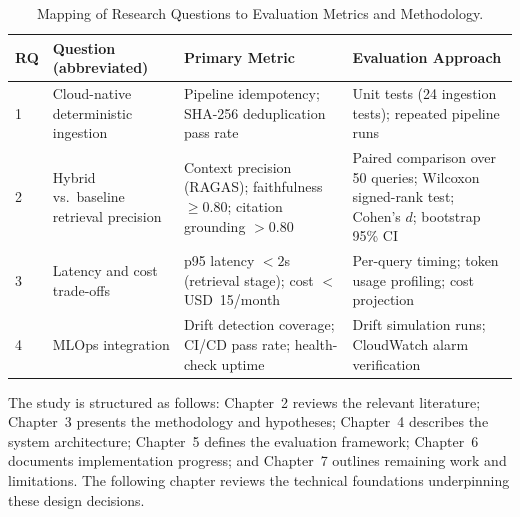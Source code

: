 \begin{table}[H]
\caption{Mapping of Research Questions to Evaluation Metrics and Methodology.}
\label{tab:rq_map}
\centering
\begin{tabular}{p{0.5cm}p{4.0cm}p{3.5cm}p{4.0cm}}
\toprule
\textbf{RQ} & \textbf{Question (abbreviated)} & \textbf{Primary Metric} & \textbf{Evaluation Approach} \\
\midrule
1 & Cloud-native deterministic ingestion & Pipeline idempotency; SHA-256 deduplication pass rate & Unit tests (24 ingestion tests); repeated pipeline runs \\[4pt]
2 & Hybrid vs.\ baseline retrieval precision & Context precision (RAGAS); faithfulness $\geq 0.80$; citation grounding $> 0.80$ & Paired comparison over 50 queries; Wilcoxon signed-rank test; Cohen's $d$; bootstrap 95\% CI \\[4pt]
3 & Latency and cost trade-offs & p95 latency $< 2$s (retrieval stage); cost $<$ USD~15/month & Per-query timing; token usage profiling; cost projection \\[4pt]
4 & MLOps integration & Drift detection coverage; CI/CD pass rate; health-check uptime & Drift simulation runs; CloudWatch alarm verification \\
\bottomrule
\end{tabular}
\end{table}

\medskip
\noindent The study is structured as follows: Chapter~2 reviews the relevant literature; Chapter~3 presents the methodology and hypotheses; Chapter~4 describes the system architecture; Chapter~5 defines the evaluation framework; Chapter~6 documents implementation progress; and Chapter~7 outlines remaining work and limitations. The following chapter reviews the technical foundations underpinning these design decisions.
